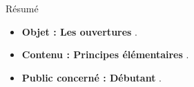 \begin{center}
\Large
Résumé
\normalsize
\end{center}
\vspace{3cm}
\begin{itemize}[leftmargin=1cm, label=, itemsep=21pt]
\item {\bf Objet : Les ouvertures} .
\item {\bf Contenu : Principes élémentaires} .
\item {\bf Public concerné : Débutant} .
\end{itemize}

\vspace{3cm}



\vspace{3cm}


